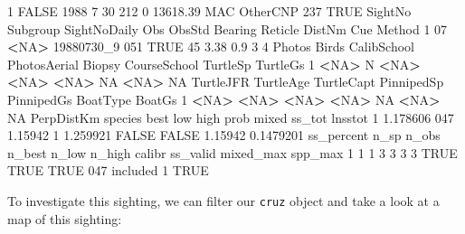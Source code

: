 \documentclass[
]{book}
\newenvironment{Shaded}{\begin{snugshade}}{\end{snugshade}}
\newcommand{\ConstantTok}[1]{\textcolor[rgb]{0.56,0.35,0.01}{#1}}
\newcommand{\DecValTok}[1]{\textcolor[rgb]{0.00,0.00,0.81}{#1}}
\newcommand{\ErrorTok}[1]{\textcolor[rgb]{0.64,0.00,0.00}{\textbf{#1}}}
\newcommand{\FloatTok}[1]{\textcolor[rgb]{0.00,0.00,0.81}{#1}}
\newcommand{\NormalTok}[1]{#1}
\newcommand{\SpecialCharTok}[1]{\textcolor[rgb]{0.81,0.36,0.00}{\textbf{#1}}}
\begin{document}
\begin{Shaded}
\begin{Highlighting}[]
\DecValTok{1}           \ConstantTok{FALSE} \DecValTok{1988}     \DecValTok{7}  \DecValTok{30}  \DecValTok{212}      \DecValTok{0} \FloatTok{13618.39}\NormalTok{  MAC OtherCNP    }\DecValTok{237} \ConstantTok{TRUE}
\NormalTok{  SightNo Subgroup SightNoDaily Obs ObsStd Bearing Reticle DistNm Cue Method}
\DecValTok{1}      \DecValTok{07}     \SpecialCharTok{\textless{}}\ConstantTok{NA}\SpecialCharTok{\textgreater{}}\NormalTok{   19880730\_9 }\DecValTok{051}   \ConstantTok{TRUE}      \DecValTok{45}    \FloatTok{3.38}    \FloatTok{0.9}   \DecValTok{3}      \DecValTok{4}
\NormalTok{  Photos Birds CalibSchool PhotosAerial Biopsy CourseSchool TurtleSp TurtleGs}
\DecValTok{1}   \SpecialCharTok{\textless{}}\ConstantTok{NA}\SpecialCharTok{\textgreater{}}\NormalTok{     N        }\SpecialCharTok{\textless{}}\ConstantTok{NA}\SpecialCharTok{\textgreater{}}         \ErrorTok{\textless{}}\ConstantTok{NA}\SpecialCharTok{\textgreater{}}   \ErrorTok{\textless{}}\ConstantTok{NA}\SpecialCharTok{\textgreater{}}           \ConstantTok{NA}     \SpecialCharTok{\textless{}}\ConstantTok{NA}\SpecialCharTok{\textgreater{}}       \ConstantTok{NA}
\NormalTok{  TurtleJFR TurtleAge TurtleCapt PinnipedSp PinnipedGs BoatType BoatGs}
\DecValTok{1}      \SpecialCharTok{\textless{}}\ConstantTok{NA}\SpecialCharTok{\textgreater{}}      \ErrorTok{\textless{}}\ConstantTok{NA}\SpecialCharTok{\textgreater{}}       \ErrorTok{\textless{}}\ConstantTok{NA}\SpecialCharTok{\textgreater{}}       \ErrorTok{\textless{}}\ConstantTok{NA}\SpecialCharTok{\textgreater{}}         \ConstantTok{NA}     \SpecialCharTok{\textless{}}\ConstantTok{NA}\SpecialCharTok{\textgreater{}}     \ConstantTok{NA}
\NormalTok{  PerpDistKm species    best low     high  prob mixed  ss\_tot   lnsstot}
\DecValTok{1}   \FloatTok{1.178606}     \DecValTok{047} \FloatTok{1.15942}   \DecValTok{1} \FloatTok{1.259921} \ConstantTok{FALSE} \ConstantTok{FALSE} \FloatTok{1.15942} \FloatTok{0.1479201}
\NormalTok{  ss\_percent n\_sp n\_obs n\_best n\_low n\_high calibr ss\_valid mixed\_max spp\_max}
\DecValTok{1}          \DecValTok{1}    \DecValTok{1}     \DecValTok{3}      \DecValTok{3}     \DecValTok{3}      \DecValTok{3}   \ConstantTok{TRUE}     \ConstantTok{TRUE}      \ConstantTok{TRUE}     \DecValTok{047}
\NormalTok{  included}
\DecValTok{1}     \ConstantTok{TRUE}
\end{Highlighting}
\end{Shaded}

To investigate this sighting, we can filter our \texttt{cruz} object and take a look at a map of this sighting:
\end{document}
